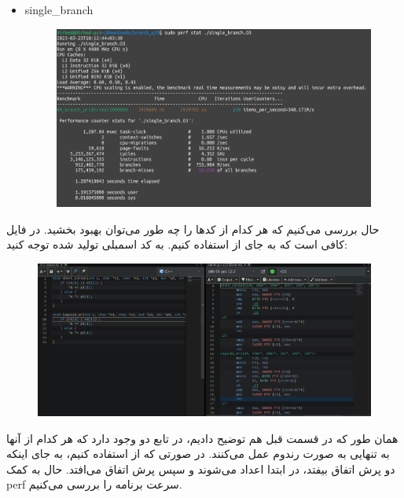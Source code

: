 \begin{enumerate}
\begin{latin}
\begin{itemize}
\begin{figure}[H]
        \end{figure}
        \item single\_branch
        \begin{figure}[H]
            \centerline{\includegraphics[scale=0.35]{pics/5/D/single_branch.png}}
        \end{figure}
    \end{itemize}
    \end{latin}
    حال بررسی می‌کنیم که هر کدام از کد‌ها را چه طور می‌توان بهبود بخشید. در فایل
    کافی است که به جای
    \lr{||}
    از
    \lr{|}
    استفاده کنیم. به کد اسمبلی تولید شده توجه کنید:
    \begin{figure}[H]
        \centerline{\includegraphics[scale=0.3]{pics/5/D/godbolt_also_always_true.png}}
    \end{figure}
    همان طور که در قسمت قبل هم توضیح دادیم، در تابع
    دو 
    وجود دارد که هر کدام از آنها به تنهایی به صورت رندوم عمل می‌کنند. در صورتی که از
    \lr{|}
    استفاده کنیم، به جای اینکه دو پرش اتفاق بیفتد، در ابتدا اعداد 
    می‌شوند و سپس پرش اتفاق می‌افتد. حال به کمک perf سرعت برنامه را بررسی ‌می‌کنیم.
    \begin{figure}[H]

\end{figure}
\end{enumerate}
